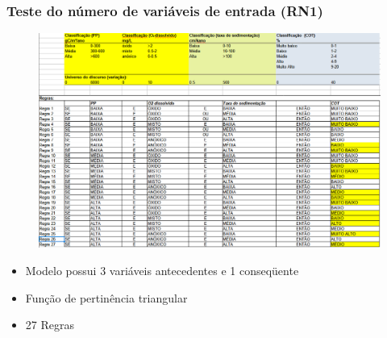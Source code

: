 \documentclass[aspectratio=169]{beamer} %
\begin{document}
{{
\begin{frame}
\frametitle{Teste do número de variáveis de entrada (RN1)} 
\begin{figure}
\centering
\includegraphics[scale=0.2]{FuzzyRN1.png}
\end{figure}
\pause
	\begin{itemize}
		\item Modelo possui 3 variáveis antecedentes e 1 conseqüente
		\pause
		\item Função de pertinência triangular
		\pause
		\item 27 Regras
	\end{itemize}
\end{frame} 
}


}
\end{document}
